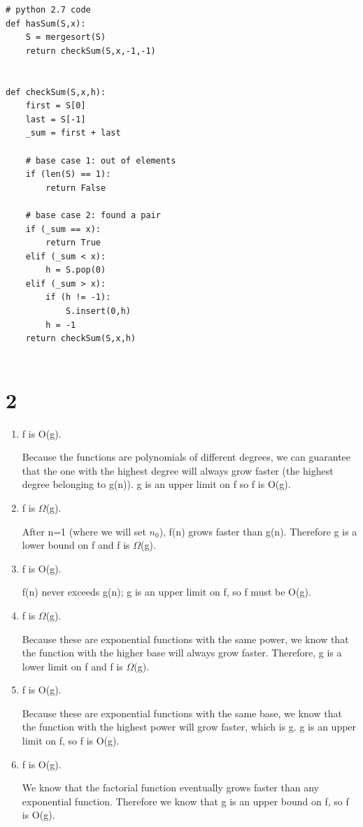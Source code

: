 \documentclass[10pt,a4paper]{report}
\begin{document}
	\begin{lstlisting}
# python 2.7 code
def hasSum(S,x):
	S = mergesort(S)
	return checkSum(S,x,-1,-1)


def checkSum(S,x,h):
	first = S[0]
	last = S[-1]
	_sum = first + last
	
	# base case 1: out of elements
	if (len(S) == 1):
		return False
	
	# base case 2: found a pair
	if (_sum == x):
		return True
	elif (_sum < x):
		h = S.pop(0)
	elif (_sum > x):
		if (h != -1):
			S.insert(0,h)
		h = -1
	return checkSum(S,x,h)
		
	\end{lstlisting}
	
	
	\newpage
	\section*{2}
	\begin{enumerate}[label=(\alph*)]
		\item f is O(g).
		
		Because the functions are polynomials of different degrees, we can guarantee that the one with the highest degree will always grow faster (the highest degree belonging to g(n)). g is an upper limit on f so f is O(g).
		
		\item f is $\Omega$(g).
		
		After n=1 (where we will set $n_0$), f(n) grows faster than g(n). Therefore g is a lower bound on f and f is $\Omega$(g).
		
		\item f is O(g).
		
		f(n) never exceeds g(n); g is an upper limit on f, so f must be O(g).
		
		\item f is $\Omega$(g).
		
		Because these are exponential functions with the same power, we know that the function with the higher base will always grow faster. Therefore, g is a lower limit on f and f is $\Omega$(g).
		
		\item f is O(g).
		
		Because these are exponential functions with the same base, we know that the function with the highest power will grow faster, which is g. g is an upper limit on f, so f is O(g).
		
		\item f is O(g).
		
		We know that the factorial function eventually grows faster than any exponential function. Therefore we know that g is an upper bound on f, so f is O(g).
	\end{enumerate}
\end{document}
